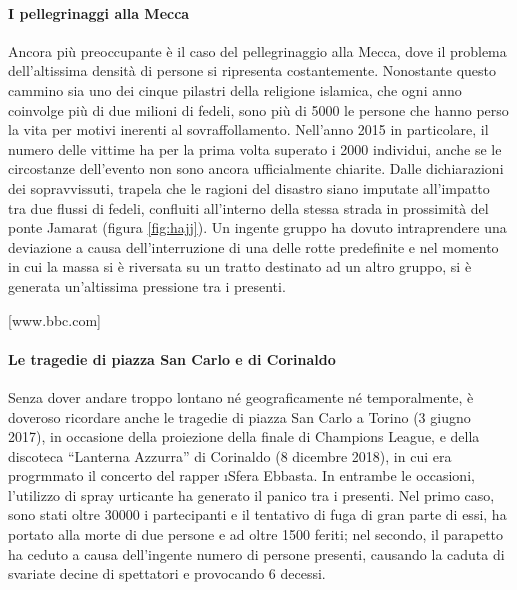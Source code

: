 \paragraph{I pellegrinaggi alla Mecca}
Ancora più preoccupante è il caso del pellegrinaggio alla Mecca, dove il problema dell'altissima densità di persone si ripresenta costantemente. Nonostante questo cammino sia uno dei cinque pilastri della religione islamica, che ogni anno coinvolge più di due milioni di fedeli, sono più di 5000 le persone che hanno perso la vita per motivi inerenti al sovraffollamento. \newline
Nell'anno 2015 in particolare, il numero delle vittime ha per la prima volta superato i 2000 individui, anche se le circostanze dell'evento non sono ancora ufficialmente chiarite. Dalle dichiarazioni dei sopravvissuti, trapela che le ragioni del disastro siano imputate all'impatto tra due flussi di fedeli, confluiti all'interno della stessa strada in prossimità del ponte Jamarat (figura \ref{fig:hajj}). Un ingente gruppo ha dovuto intraprendere una deviazione a causa dell'interruzione di una delle rotte predefinite e nel momento in cui la massa si è riversata su un tratto destinato ad un altro gruppo, si è generata un'altissima pressione tra i presenti.

[www.bbc.com]

\paragraph{Le tragedie di piazza San Carlo e di Corinaldo}
Senza dover andare troppo lontano né geograficamente né temporalmente, è doveroso ricordare anche le tragedie di piazza San Carlo a Torino (3 giugno 2017), in occasione della proiezione della finale di Champions League, e della discoteca \enquote{Lanterna Azzurra} di Corinaldo (8 dicembre 2018), in cui era progrmmato il concerto del rapper \i{Sfera Ebbasta}. \newline
In entrambe le occasioni, l'utilizzo di spray urticante ha generato il panico tra i presenti. Nel primo caso, sono stati oltre 30000 i partecipanti e il tentativo di fuga di gran parte di essi, ha portato alla morte di due persone e ad oltre 1500 feriti; nel secondo, il parapetto ha ceduto a causa dell'ingente numero di persone presenti, causando la caduta di svariate decine di spettatori e provocando 6 decessi.

